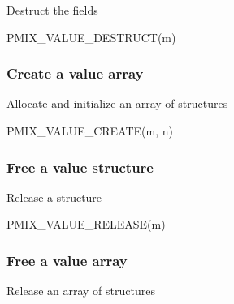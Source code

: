 Destruct the  fields

\cspecificstart
\begin{codepar}
PMIX_VALUE_DESTRUCT(m)
\end{codepar}
\cspecificend

\begin{arglist}
\end{arglist}

\subsubsection{Create a value array}

Allocate and initialize an array of  structures

\cspecificstart
\begin{codepar}
PMIX_VALUE_CREATE(m, n)
\end{codepar}
\cspecificend

\begin{arglist}
\end{arglist}


\subsubsection{Free a value structure}

Release a  structure

\cspecificstart
\begin{codepar}
PMIX_VALUE_RELEASE(m)
\end{codepar}
\cspecificend

\begin{arglist}
\end{arglist}

\subsubsection{Free a value array}

Release an array of  structures

